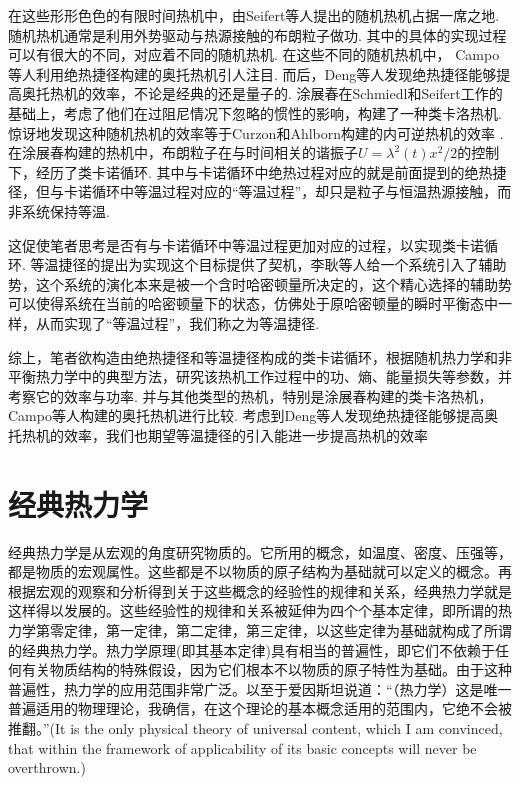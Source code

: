 在这些形形色色的有限时间热机中，由Seifert等人提出的随机热机\cite{Schmiedl2008}占据一席之地. 随机热机通常是利用外势驱动与热源接触的布朗粒子做功. 其中的具体的实现过程可以有很大的不同，对应着不同的随机热机. 在这些不同的随机热机中， Campo等人利用绝热捷径构建的奥托热机\cite{DelCampo2014}引人注目. 而后，Deng等人发现绝热捷径能够提高奥托热机的效率，不论是经典的还是量子的.\cite{Deng2013} 涂展春在Schmiedl和Seifert工作\cite{Schmiedl2008}的基础上，考虑了他们在过阻尼情况下忽略的惯性的影响，构建了一种类卡洛热机\cite{Tu2013}. 惊讶地发现这种随机热机的效率等于Curzon和Ahlborn构建的内可逆热机\cite{Curzon1975}的效率 . 在涂展春构建的热机中\cite{Tu2013}，布朗粒子在与时间相关的谐振子$U=\lambda ^2\left( t \right) x^2/2$的控制下，经历了类卡诺循环. 其中与卡诺循环中绝热过程对应的就是前面提到的绝热捷径，但与卡诺循环中等温过程对应的“等温过程”，却只是粒子与恒温热源接触，而非系统保持等温. 

这促使笔者思考是否有与卡诺循环中等温过程更加对应的过程，以实现类卡诺循环. 等温捷径\cite{Li2016}的提出为实现这个目标提供了契机，李耿等人给一个系统引入了辅助势，这个系统的演化本来是被一个含时哈密顿量所决定的，这个精心选择的辅助势可以使得系统在当前的哈密顿量下的状态，仿佛处于原哈密顿量的瞬时平衡态中一样，从而实现了“等温过程”，我们称之为等温捷径.

综上，笔者欲构造由绝热捷径和等温捷径构成的类卡诺循环，根据随机热力学和非平衡热力学中的典型方法，研究该热机工作过程中的功、熵、能量损失等参数，并考察它的效率与功率. 并与其他类型的热机，特别是涂展春构建的类卡洛热机\cite{Tu2013}，Campo等人构建的奥托热机\cite{DelCampo2014}进行比较. 考虑到Deng等人发现绝热捷径能够提高奥托热机的效率\cite{Deng2013}，我们也期望等温捷径的引入能进一步提高热机的效率


\section{经典热力学}

\qquad 经典热力学是从宏观的角度研究物质的。它所用的概念，如温度、密度、压强等，都是物质的宏观属性。这些都是不以物质的原子结构为基础就可以定义的概念。再根据宏观的观察和分析得到关于这些概念的经验性的规律和关系，经典热力学就是这样得以发展的。这些经验性的规律和关系被延伸为四个个基本定律，即所谓的热力学第零定律，第一定律，第二定律，第三定律，以这些定律为基础就构成了所谓的经典热力学。热力学原理(即其基本定律)具有相当的普遍性，即它们不依赖于任何有关物质结构的特殊假设，因为它们根本不以物质的原子特性为基础。由于这种普遍性，热力学的应用范围非常广泛。以至于爱因斯坦说道\cite{schilpp1979albert}：“（热力学）这是唯一普遍适用的物理理论，我确信，在这个理论的基本概念适用的范围内，它绝不会被推翻。”(It is the only physical theory of universal
content, which I am convinced, that within the framework
of applicability of its basic concepts will never be
overthrown.)

